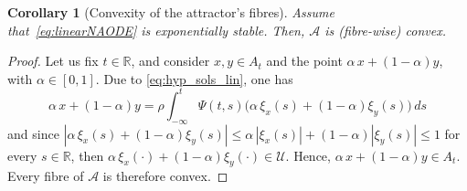 \documentclass[reqno]{amsart}
\newtheorem{cor}[thm]{Corollary}
\theoremstyle{definition}
\numberwithin{equation}{section}
\newcommand{\N}{\mathbb{N}}
\newcommand{\R}{\mathbb{R}}
\newcommand{\A}{\mathcal{A}}
\newcommand{\U}{\mathcal{U}}
\newcommand\note[1]{\marginpar{\flushleft\sffamily\tiny #1}}
\newcommand{\nin}{{n\in\N}}
\begin{document}
\begin{cor}[Convexity of the attractor's fibres]\label{cor:convexity}
    Assume that~\eqref{eq:linearNAODE} is exponentially stable.  Then, $\A$ is (fibre-wise) convex.%
\end{cor}
\begin{proof}

    Let us fix $t\in\R$, and consider $x,y\in A_t$ and the point $\alpha\,x+(1-\alpha) y$, with $\alpha\in [0,1]$. Due to \eqref{eq:hyp_sols_lin}, one has
    \[
    \alpha\,x+(1-\alpha) y= \rho\int_{-\infty}^t\Psi(t,s)\big(\alpha\,\xi_x(s)+(1-\alpha)\xi_y(s)\big)\,ds
    \]
    and since $|\alpha\,\xi_x(s)+(1-\alpha)\xi_y(s)|\le \alpha\,|\xi_x(s)|+(1-\alpha)|\xi_y(s)|\le 1$ for every $s\in \R$, then $\alpha\,\xi_x(\cdot)+(1-\alpha)\xi_y(\cdot)\in\U$. Hence, $\alpha\,x+(1-\alpha) y\in A_t$. Every fibre of $\A$ is therefore convex. %
\end{proof}
\end{document}
